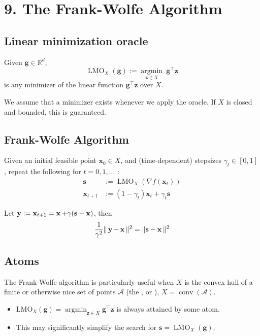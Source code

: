\section*{9. The Frank-Wolfe Algorithm}
\subsection*{Linear minimization oracle}
Given $\mathbf{g} \in \mathbb{R}^{d}$,
$$
\operatorname{LMO}_{X}(\mathbf{g}):=\underset{\mathbf{z} \in X}{\operatorname{argmin}} \ \mathbf{g}^{\top} \mathbf{z}
$$
is any minimizer of the linear function $\mathbf{g}^{\top} \mathbf{z}$ over $X$.

We assume that a minimizer exists whenever we apply the oracle. If $X$ is closed and bounded, this is guaranteed.




\subsection*{Frank-Wolfe Algorithm}
Given an initial feasible point $\mathbf{x}_{0} \in X$, and (time-dependent) stepsizes $\gamma_{t} \in[0,1]$, repeat the following for $t=0,1, \ldots$ :
$$
\begin{aligned}
\mathbf{s} &:=\operatorname{LMO}_{X}\left(\nabla f\left(\mathbf{x}_{t}\right)\right) \\
\mathbf{x}_{t+1} &:=\left(1-\gamma_{t}\right) \mathbf{x}_{t}+\gamma_{t} \mathbf{s}
\end{aligned}
$$

Let $\operatorname{\boldsymbol{\mathbf{y}}} := \operatorname{\boldsymbol{\mathbf{x}}}_{t+1} = \operatorname{\boldsymbol{\mathbf{x}}} + \gamma(\boldsymbol{\mathbf{s}} -\operatorname{\boldsymbol{\mathbf{x}}})$, then
$$
\frac{1}{\gamma^2} \|\operatorname{\boldsymbol{\mathbf{y}}} - \operatorname{\boldsymbol{\mathbf{x}}}\|^2 = \|\boldsymbol{\mathbf{s}}- \operatorname{\boldsymbol{\mathbf{x}}}\|^2
$$




\subsection*{Atoms}
The Frank-Wolfe algorithm is particularly useful when $X$ is the convex hull of a finite or otherwise nice set of points $\mathcal{A}$ (the , or ), $X=\operatorname{conv}(\mathcal{A})$.
\begin{itemize}[leftmargin=*]
    \item $\mathrm{LMO}_{X}(\mathbf{g})=\operatorname{argmin}_{\mathbf{z} \in X} \mathbf{g}^{\top} \mathbf{z}$ is always attained by some atom.
    \item This may significantly simplify the search for $\mathbf{s}=\operatorname{LMO}_{X}(\mathbf{g})$.
\end{itemize}






